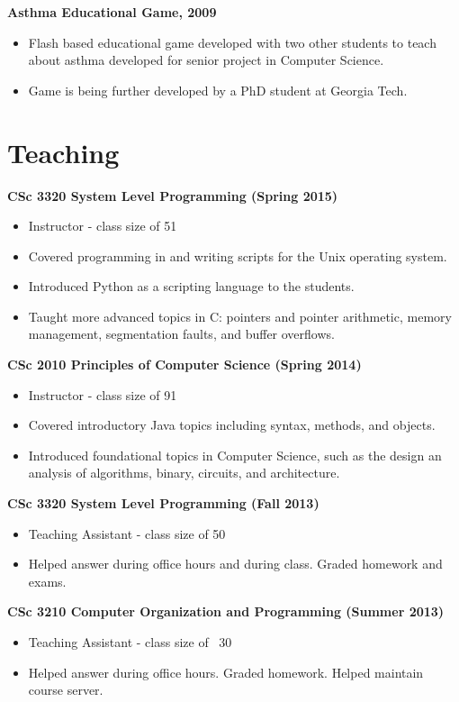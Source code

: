 \documentclass{res}
\begin{document}
\begin{resume}
{\bf Asthma Educational Game, 2009}
    \begin{itemize}
    \item Flash based educational game developed with two other students to teach about
asthma developed for senior project in Computer Science.
\item Game is being further developed by a PhD student at Georgia Tech.
   \end{itemize}
\newpage
\section{Teaching}

{\bf CSc 3320  System Level Programming (Spring 2015) }
\begin{itemize}
	\item Instructor - class size of 51
	\item Covered programming in and writing scripts for the Unix operating system.
	\item Introduced Python as a scripting language to the students.
	\item Taught more advanced topics in C: pointers and pointer arithmetic, memory management, segmentation faults, and buffer overflows.
\end{itemize}


{\bf CSc 2010 Principles of Computer Science (Spring 2014) }
\begin{itemize}
	\item Instructor - class size of 91
	\item Covered introductory Java topics including syntax, methods, and objects.
	\item Introduced foundational topics in Computer Science, such as the design an analysis of algorithms, binary, circuits, and architecture.
\end{itemize}


{\bf CSc 3320  System Level Programming (Fall 2013)}
    \begin{itemize}
    \item Teaching Assistant - class size of 50
      \item Helped answer during office hours and during class.  Graded homework and exams.  
    \end{itemize}


{\bf CSc 3210 Computer Organization and Programming (Summer 2013)}
    \begin{itemize}
    \item Teaching Assistant - class size of ~30
      \item Helped answer during office hours.  Graded homework.  Helped maintain course server.
    \end{itemize}




\end{resume}
\end{document}
